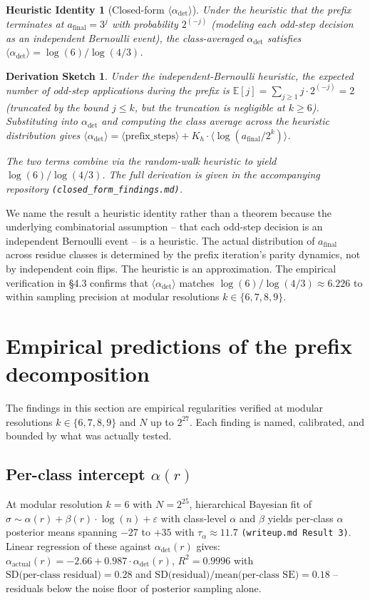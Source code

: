 \documentclass{article}
\theoremstyle{plain}
\newtheorem{heuristic}[theorem]{Heuristic Identity}
\newtheorem{derivation}[theorem]{Derivation Sketch}
\begin{document}
\begin{heuristic}[Closed-form $\langle \alpha_{\text{det}} \rangle$]
\label{heur:alpha_det}
Under the heuristic that the prefix terminates at $a_{\text{final}} = 3^j$ with probability $2^{(-j)}$ (modeling each odd-step decision as an independent Bernoulli event), the class-averaged $\alpha_{\text{det}}$ satisfies $\langle \alpha_{\text{det}} \rangle = \log(6)/ \log(4/3)$.
\end{heuristic}

\begin{derivation}
\label{der:bern}
Under the independent-Bernoulli heuristic, the expected number of odd-step applications during the prefix is $\mathbb{E}[j] = \sum_{j \geq 1} j \cdot 2^{(-j)}=2$ (truncated by the bound $j \leq k$, but the truncation is negligible at $k \geq 6$). Substituting into $\alpha_{\text{det}}$ and computing the class average across the heuristic distribution gives $\langle \alpha_{\text{det}} \rangle = \langle \text{prefix\_steps} \rangle + K_h \cdot \langle \log(a_{\text{final}} / 2^k) \rangle$.

The two terms combine via the random-walk heuristic to yield $\log(6)/ \log(4/3)$. The full derivation is given in the accompanying repository \verb|(closed_form_findings.md)|.
\end{derivation}

We name the result a heuristic identity rather than a theorem because the underlying combinatorial assumption -- that each odd-step decision is an independent Bernoulli event -- is a heuristic. The actual distribution of $a_{\text{final}}$ across residue classes is determined by the prefix iteration's parity dynamics, not by independent coin flips. The heuristic is an approximation. The empirical verification in \S4.3 confirms that $\langle \alpha_{\text{det}} \rangle$ matches $\log(6)/ \log(4/3) \approx 6.226$ to within sampling precision at modular resolutions $k \in \{6, 7, 8, 9\}$.

\section{Empirical predictions of the prefix decomposition}
The findings in this section are empirical regularities verified at modular resolutions $k \in \{6, 7, 8, 9\}$ and $N$ up to $2^{27}$. Each finding is named, calibrated, and bounded by what was actually tested.

\subsection{Per-class intercept $\alpha(r)$}
At modular resolution $k = 6$ with $N=2^{25}$, hierarchical Bayesian fit of $\sigma \sim \alpha(r) + \beta(r) \cdot \log(n) + \varepsilon$ with class-level $\alpha$ and $\beta$ yields per-class $\alpha$ posterior means spanning $-27$ to $+35$ with $\tau_\alpha \approx 11.7$ \verb|(writeup.md Result 3)|. Linear regression of these against $\alpha_{\text{det}}(r)$ gives: $\alpha_{\text{actual}}(r) = -2.66 + 0.987 \cdot \alpha_{\text{det}}(r)$, $R^2 = 0.9996$ with $\text{SD(per-class residual)} = 0.28$ and $\text{SD(residual)}/ \text{mean(per-class SE)} = 0.18$ -- residuals below the noise floor of posterior sampling alone.
\end{document}

